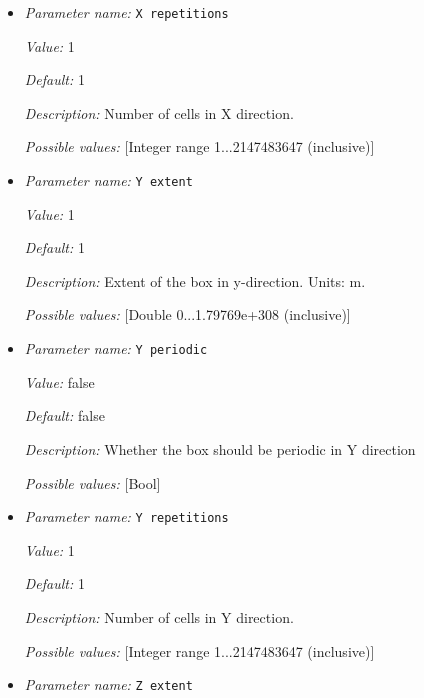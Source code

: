 \begin{itemize}
{\it Value:} false


{\it Default:} false


{\it Description:} Whether the box should be periodic in X direction


{\it Possible values:} [Bool]
\item {\it Parameter name:} {\tt X repetitions}
\label{parameters:Geometry model/Box/X repetitions}


{\it Value:} 1


{\it Default:} 1


{\it Description:} Number of cells in X direction.


{\it Possible values:} [Integer range 1...2147483647 (inclusive)]
\item {\it Parameter name:} {\tt Y extent}
\label{parameters:Geometry model/Box/Y extent}


{\it Value:} 1


{\it Default:} 1


{\it Description:} Extent of the box in y-direction. Units: m.


{\it Possible values:} [Double 0...1.79769e+308 (inclusive)]
\item {\it Parameter name:} {\tt Y periodic}
\label{parameters:Geometry model/Box/Y periodic}


{\it Value:} false


{\it Default:} false


{\it Description:} Whether the box should be periodic in Y direction


{\it Possible values:} [Bool]
\item {\it Parameter name:} {\tt Y repetitions}
\label{parameters:Geometry model/Box/Y repetitions}


{\it Value:} 1


{\it Default:} 1


{\it Description:} Number of cells in Y direction.


{\it Possible values:} [Integer range 1...2147483647 (inclusive)]
\item {\it Parameter name:} {\tt Z extent}
\label{parameters:Geometry model/Box/Z extent}



\end{itemize}
